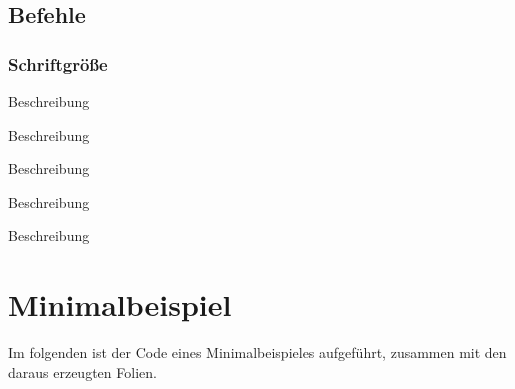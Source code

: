 \documentclass[cmyk,a4paper,colorscheme=green,TUBStitlepage=picture]{tubsreprt}
\begin{document}





\section{Befehle}


\subsection{Schriftgröße}

\begin{classoption}{9pt}
  Beschreibung
\end{classoption}

\begin{classoption}{10pt}
  Beschreibung
\end{classoption}

\begin{classoption}{11pt}
  Beschreibung
\end{classoption}

\begin{classoption}{12pt}
  Beschreibung
\end{classoption}

\begin{classoption}{14pt}
  Beschreibung
\end{classoption}


\chapter{Minimalbeispiel}

Im folgenden ist der Code eines Minimalbeispieles aufgeführt, zusammen mit den
daraus erzeugten Folien.
\end{document}
